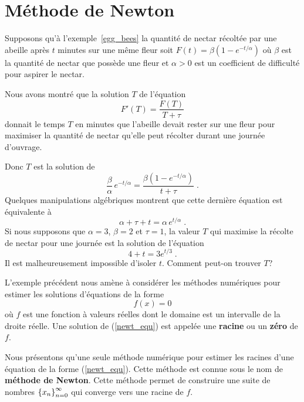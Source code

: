 {\section{Méthode de Newton \life \eng}\label{MethNewtonSect}

\begin{egg}[\life]
Supposons qu'à l'exemple~\ref{egg_bees} la quantité de nectar récoltée
par une abeille après $t$ minutes sur une même fleur soit
$F(t) = \beta (1-e^{-t/\alpha})$ où $\beta$ est la quantité de nectar
que possède une fleur et $\alpha>0$ est un coefficient de difficulté
pour aspirer le nectar.

Nous avons montré que la solution $T$ de l'équation
\[
F'(T) = \frac{F(T)}{T+\tau}
\]
donnait le temps $T$ en minutes que l'abeille devait rester sur une
fleur pour maximiser la quantité de nectar qu'elle peut récolter
durant une journée d'ouvrage.

Donc $T$ est la solution de
\[
\frac{\beta}{\alpha}\, e^{-t/\alpha} =
 \frac{\beta(1-e^{-t/\alpha})}{t+\tau} \; .
\]
Quelques manipulations algébriques montrent que cette dernière
équation est équivalente à
\[
\alpha + \tau + t = \alpha\, e^{t/\alpha} \; .
\]
Si nous supposons que $\alpha=3$, $\beta=2$ et $\tau=1$, la valeur $T$ qui
maximise la récolte de nectar pour une journée est la solution de
l'équation
\[
4 + t = 3 e^{t/3} \; .
\]
Il est malheureusement impossible d'isoler $t$.  Comment peut-on
trouver $T$?
\label{newt_bees}
\end{egg}

L'exemple précédent nous amène à considérer les méthodes numériques
pour estimer les solutions d'équations de la forme
\begin{equation} \label{newt_equ}
f(x)  = 0
\end{equation}
où $f$ est une fonction à valeurs réelles dont le domaine est un
intervalle de la droite réelle.  Une solution de (\ref{newt_equ}) est
appelée une {\bfseries racine} ou un {\bfseries zéro} de $f$.
 

Nous présentons qu'une seule méthode numérique pour estimer les
racines d'une équation de la forme (\ref{newt_equ}).  Cette méthode
est connue sous le nom de {\bfseries méthode de Newton}.  Cette
méthode permet de construire une suite de nombres
$\displaystyle \left\{ x_n \right\}_{n=0}^\infty$ qui converge vers une
racine de $f$.

}
